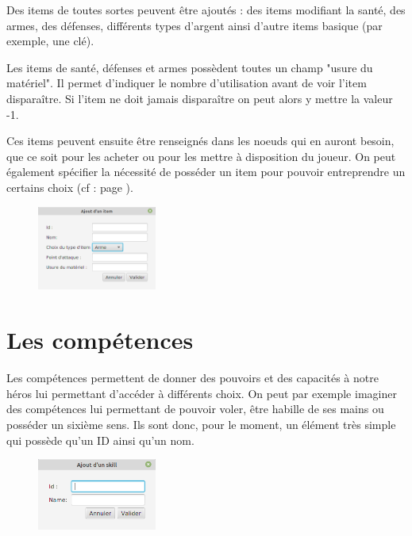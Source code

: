 		Des items de toutes sortes peuvent être ajoutés : des items modifiant la santé, des armes, des défenses, différents types d'argent ainsi d'autre items basique (par exemple, une clé).

		Les items de santé, défenses et armes possèdent toutes un champ "usure du matériel". Il permet d'indiquer le nombre d'utilisation avant de voir l'item disparaître. Si l'item ne doit jamais disparaître on peut alors y mettre la valeur -1.

		Ces items peuvent ensuite être renseignés dans les noeuds qui en auront besoin, que ce soit pour les acheter ou pour les mettre à disposition du joueur. On peut également spécifier la nécessité de posséder un item pour pouvoir entreprendre un certains choix (cf :  page \pageref{sec:prerequis}).

		\begin{figure}[H]
			\centering\includegraphics[width=0.35\textwidth, keepaspectratio]{img/itemDialog.png}
		\end{figure}

	\section{Les compétences}
		\label{sec:skills}

		Les compétences permettent de donner des pouvoirs et des capacités à notre héros lui permettant d'accéder à différents choix. On peut par exemple imaginer des compétences lui permettant de pouvoir voler, être habille de ses mains ou posséder un sixième sens. Ils sont donc, pour le moment, un élément très simple qui possède qu'un ID ainsi qu'un nom.

		\begin{figure}[H]
			\centering\includegraphics[width=0.35\textwidth, keepaspectratio]{img/skillDialog.png}
		\end{figure}

